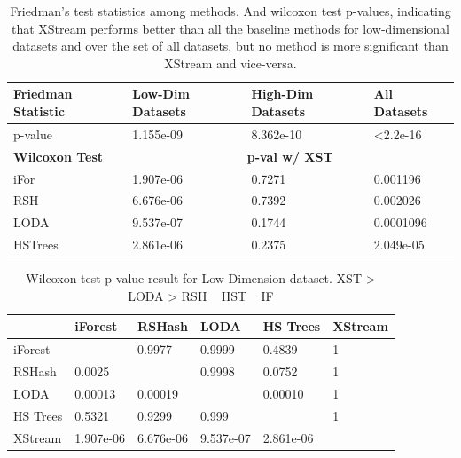 \begin{table}[]
\centering
\begin{tabular}{l|lll}
\hline	\hline
\textbf{Friedman Statistic} & \textbf{Low-Dim Datasets} & \textbf{High-Dim Datasets} & \textbf{All Datasets}    \\ \hline
p-value            & 1.155e-09        & 8.362e-10         & \textless2.2e-16 \\ \hline \hline
\textbf{Wilcoxon Test}      & \multicolumn{3}{c}{\textbf{p-val w/ XST}}                        \\ 	\hline
iFor               & 1.907e-06         & 0.7271         &  0.001196       \\
RSH                & 6.676e-06         & 0.7392         & 0.002026        \\
LODA               & 9.537e-07         & 0.1744         & 0.0001096            \\
HSTrees            & 2.861e-06        & 0.2375          &  2.049e-05	\\	\hline
\end{tabular}
\caption{Friedman's test statistics among methods. And wilcoxon test p-values, indicating that XStream performs better than all the baseline methods for low-dimensional datasets and over the set of all datasets, but no method is more significant than XStream and vice-versa.}
\label{my-label}
\end{table}

\begin{table}
\centering
    \begin{tabular}{|l|lllll|}
    \hline
    ~        & iForest   & RSHash    & LODA      & HS Trees  & XStream \\	\hline
    iForest  & ~         & 0.9977    & 0.9999    & 0.4839    & 1       \\ 
    RSHash   & 0.0025    & ~         & 0.9998    & 0.0752    & 1       \\
    LODA     & 0.00013   & 0.00019   & ~         & 0.00010   & 1       \\
    HS Trees & 0.5321    & 0.9299    & 0.999     & ~         & 1       \\
    XStream  & 1.907e-06 & 6.676e-06 & 9.537e-07 & 2.861e-06 & ~       \\	\hline
    \end{tabular}
    \caption{Wilcoxon test p-value result for Low Dimension dataset. XST > LODA > RSH ~ HST ~ IF}
\end{table}

